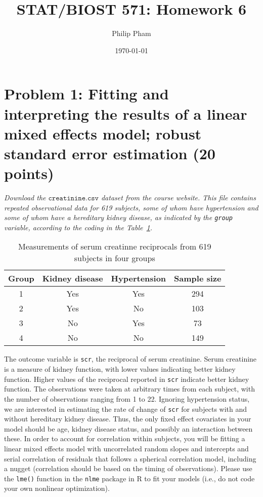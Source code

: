 \documentclass[11pt, letterpaper]{article}
\title{STAT/BIOST 571: Homework 6}
\author{Philip Pham}
\date{\today}
\begin{document}
\maketitle

\section*{Problem 1: Fitting and interpreting the results of a linear mixed effects model; robust standard error estimation (20 points)}
 
{\em Download the $\texttt{creatinine.csv}$ dataset from the course website.  This file
contains repeated observational data for 619 subjects, some of whom have hypertension and some
of whom have a hereditary kidney disease, as indicated by the \texttt{group} variable, according to the coding in the Table~\ref{ta:orig.hw1}.
\begin{table}[ht]
\center
\begin{tabular}{cccc}
\hline
Group&Kidney disease&Hypertension&Sample size\\
\hline
1&Yes&Yes&294\\
2&Yes&No&103\\
3&No&Yes&73\\
4&No&No&149\\
\hline
\end{tabular}
\caption{Measurements of serum creatinne reciprocals from 619 subjects in four groups}
\label{ta:orig.hw1}
\end{table}
The outcome variable is \texttt{scr}, the reciprocal of
serum creatinine.  Serum creatinine is a measure of kidney function, with lower values
indicating better kidney function.  Higher values of the reciprocal reported in \texttt{scr} indicate better kidney function.  The observations were taken at arbitrary times from each subject, with the number
of observations ranging from 1 to 22.  Ignoring hypertension status, we are interested in estimating
the rate of change of \texttt{scr} for subjects with and without hereditary kidney disease.
Thus, the only fixed effect covariates in your model should be age, kidney disease status, and possibly an
interaction between these. 
In order to account for correlation within subjects, you will be fitting a linear mixed effects model with
uncorrelated random slopes and intercepts and serial correlation of residuals that follows a spherical
correlation model, including a nugget (correlation should be based on the timing of observations).  Please use the \texttt{lme()} function in the \texttt{nlme} package in R to fit your models (i.e., do not code your own nonlinear optimization).}
\end{document}
